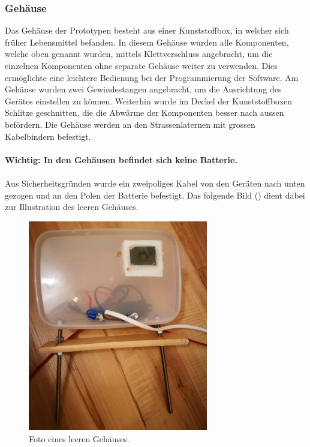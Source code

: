 \newpage
\subsubsection{Gehäuse}
Das Gehäuse der Prototypen besteht aus einer Kunststoffbox, in welcher sich früher Lebensmittel befanden. In diesem Gehäuse wurden alle Komponenten, welche oben genannt wurden, mittels Klettverschluss angebracht, um die einzelnen Komponenten ohne separate Gehäuse weiter zu verwenden. Dies ermöglichte eine leichtere Bedienung bei der Programmierung der Software. Am Gehäuse wurden zwei Gewindestangen angebracht, um die Ausrichtung des Gerätes einstellen zu können. Weiterhin wurde im Deckel der Kunststoffboxen Schlitze geschnitten, die die Abwärme der Komponenten besser nach aussen befördern. Die Gehäuse werden an den Strassenlaternen mit grossen Kabelbindern befestigt.\\\\
\textbf{Wichtig: In den Gehäusen befindet sich keine Batterie.}\\\\
Aus Sicherheitsgründen wurde ein zweipoliges Kabel von den Geräten nach unten gezogen und an den Polen der Batterie befestigt. Das folgende Bild () dient dabei zur Illustration des leeren Gehäuses.

\begin{figure}[H]
  \centering
  \includegraphics[width=0.7\textwidth]{Hardware/Gehaeuse.jpg} 
  \caption{Foto eines leeren Gehäuses.}
  \label{bGehäuse}
\end{figure}